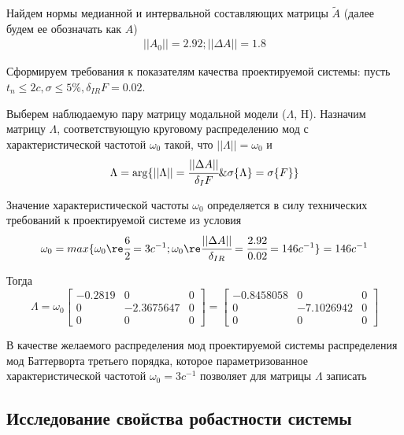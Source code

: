 Найдем нормы медианной и интервальной составляющих матрицы $\tilde{A}$ (далее будем ее обозначать как $A$)
\begin{align}
    ||A_0|| = 2.92; ||\Delta A|| = 1.8
\end{align}

Сформируем требования к показателям качества проектируемой системы: пусть $t_{n} \le 2c,  \sigma \le 5\%, \delta_{IR} F = 0.02$.

Выберем наблюдаемую пару матрицу модальной модели ($\Lambda$, H). Назначим матрицу $\Lambda$, соответствующую круговому распределению мод с характеристической частотой $\omega_0$ такой, что $||\Lambda|| = \omega_0$ и
\begin{equation}
	\Lambda = \arg\{||\Lambda|| = \cfrac{||\Delta A||}{\delta_{I} F} \& \sigma\{\Lambda\} = \sigma\{F\} \}
\end{equation}

Значение характеристической частоты $\omega_0$ определяется в силу технических требований к проектируемой системе из условия
\begin{equation}
	\omega_0 = max \{\omega_0 \re \cfrac{6}{2} = 3c^{-1}; \omega_0 \re \cfrac{||\Delta A||}{\delta_{IR}} = \cfrac{2.92}{0.02} =  146c^{-1}\} = 146 c^{-1}
\end{equation}

Тогда
\begin{equation}
	\Lambda = \omega_0 
	\begin{bmatrix}
	 - 0.2819&0&0\\
	0&- 2.3675647&0\\  
	0 &0&0
	\end{bmatrix}
	=
	\begin{bmatrix}
  - 0.8458058 &   0        &    0  \\
	0         & - 7.1026942 &   0  \\
	0         &   0         &   0 
	\end{bmatrix}
\end{equation}

 В качестве желаемого распределения мод проектируемой системы распределения мод Баттерворта третьего порядка, которое параметризованное характеристической частотой $\omega_0 = 3c^{-1}$ позволяет для матрицы $\Lambda$ записать


\subsection{Исследование свойства робастности системы}


\newpage